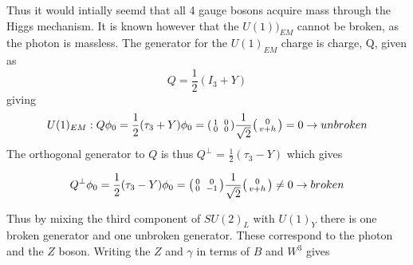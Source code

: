 Thus it would intially seemd that all 4 gauge bosons acquire mass through the Higgs mechanism.
It is known however that the $U(1))_{EM}$ cannot be broken, as the photon is massless. The generator for the $U(1)_{EM}$ charge is charge, Q, given as
\begin{equation}
  Q = \frac{1}{2}(I_{3}+Y)
\end{equation}
giving
\begin{equation}
  U(1)_{EM}: Q\phi_{0} = \frac{1}{2}(\tau_{3} + Y)\phi_{0} = \begin{psmallmatrix}1&&0\\0&&0\end{psmallmatrix}\frac{1}{\sqrt{2}} \begin{psmallmatrix}0\\v+h\end{psmallmatrix}= 0 \to unbroken\\
\end{equation}
The orthogonal generator to $Q$ is thus $Q^{\perp}$ = $\frac{1}{2}(\tau_{3} - Y)$ which gives

\begin{equation}
 Q^{\perp}\phi_{0} = \frac{1}{2}(\tau_{3} - Y)\phi_{0} = \begin{psmallmatrix}0&&0\\0&&-1\end{psmallmatrix}\frac{1}{\sqrt{2}} \begin{psmallmatrix}0\\v+h\end{psmallmatrix}\neq 0 \to broken\\
\end{equation}

Thus by mixing the third component of $SU(2)_{L}$ with $U(1)_{Y}$ there is one broken generator and one unbroken generator. These correspond to the photon and the $Z$ boson. Writing the $Z$ and $\gamma$ in terms of $B$ and $W^{3}$ gives


